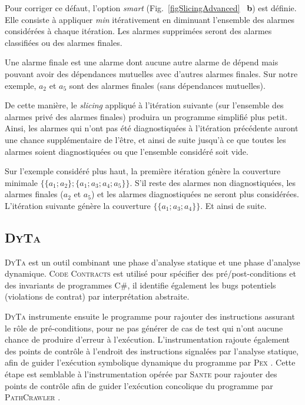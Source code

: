 \documentclass[french]{spimufcphdthesis}
\begin{document}
Pour corriger ce défaut, l'option {\em smart} (Fig.~\ref{figSlicingAdvanced}
~\textbf{b}) est définie. Elle consiste à appliquer {\em min} itérativement en
diminuant l'ensemble des alarmes considérées à chaque itération. Les alarmes
supprimées seront des alarmes classifiées ou des alarmes finales.

\begin{definition}
Une alarme finale est une alarme dont aucune autre alarme de dépend mais
pouvant avoir des dépendances mutuelles avec d'autres alarmes finales.
Sur notre exemple, $a_2$ et $a_5$ sont des alarmes finales (sans dépendances
mutuelles).
\end{definition}

De cette manière, le {\em slicing} appliqué à l'itération suivante (sur
l'ensemble des alarmes privé des alarmes finales) produira un programme
simplifié plus petit. Ainsi, les alarmes qui n'ont pas été diagnostiquées à
l'itération précédente auront une chance supplémentaire de l'être, et ainsi de
suite jusqu'à ce que toutes les alarmes soient diagnostiquées ou que l'ensemble
considéré soit vide.

Sur l'exemple considéré plus haut, la première itération génère la
couverture minimale $\{\{a_1; a_2\}; \{a_1; a_3; a_4; a_5\}\}$. S'il reste des
alarmes non diagnostiquées, les alarmes finales ($a_2$ et $a_5$) et les alarmes
diagnostiquées ne seront plus considérées. L'itération suivante génère la
couverture $\{\{a_1; a_3; a_4\}\}$. Et ainsi de suite.


\subsection{\textsc{DyTa}}

\textsc{DyTa} \cite{DyTa} est un outil combinant une phase d'analyse statique et
une phase d'analyse dynamique. \textsc{Code Contracts} \cite{CodeContracts} est
utilisé pour spécifier des pré/post-conditions et des invariants de programmes
C\#, il identifie également les bugs potentiels (violations de contrat) par
interprétation abstraite.

\textsc{DyTa} instrumente ensuite le programme pour rajouter des instructions
assurant le rôle de pré-conditions, pour ne pas générer de cas de test qui n'ont
aucune chance de produire d'erreur à l'exécution. L'instrumentation rajoute
également des points de contrôle à l'endroit des instructions signalées par
l'analyse statique, afin de guider l'exécution symbolique dynamique du programme
par \textsc{Pex} \cite{PEX}. Cette étape est semblable à l'instrumentation
opérée par \textsc{Sante} \cite{SANTE} pour rajouter des points de contrôle afin
de guider l'exécution concolique du programme par \textsc{PathCrawler}
\cite{PathCrawler}.
\end{document}
